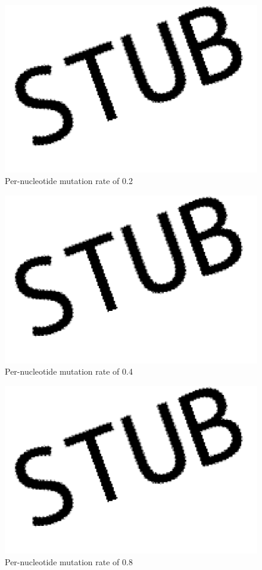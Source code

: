 \begin{figure}[H]
  \includegraphics[width=\textwidth]{pirouette_example_24/example_24/318/errors.png}
  \caption{Per-nucleotide mutation rate of 0.2}
\end{figure}

\begin{figure}[H]
  \includegraphics[width=\textwidth]{pirouette_example_24/example_24/319/errors.png}
  \caption{Per-nucleotide mutation rate of 0.4}
\end{figure}

\begin{figure}[H]
  \includegraphics[width=\textwidth]{pirouette_example_24/example_24/320/errors.png}
  \caption{Per-nucleotide mutation rate of 0.8}
\end{figure}

